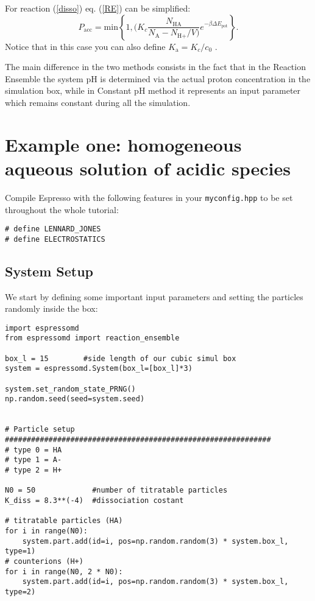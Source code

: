 \documentclass[
a4paper,                        %
11pt,                           %
twoside,                        %
footsepline,                    %
headsepline,                    %
headexclude,                    %
footexclude,                    %
pagesize,                       %
]{scrartcl}
\begin{document}
\noindent For reaction (\ref{disso}) eq. (\ref{RE}) can be simplified: 
\begin{equation}
P_{\text{acc}} = \text{min} \left\lbrace 1, (  K_c \frac{N_{\text{HA}}}{N_\text{A} - N_{\text{H}+}/V)} e^{-\beta \Delta E_\text{pot}}  \right\rbrace\text{.}
\end{equation}
Notice that in this case you can also define $K_\text{a} = K_c/c_0$ .

The main difference in the two methods consists in the fact that in the Reaction Ensemble the system pH is determined via the actual proton concentration in the simulation box, while in Constant pH method it represents an input parameter which remains constant during all the simulation.


\section{Example one: homogeneous aqueous solution of acidic species}

Compile Espresso with the following features in your
\texttt{myconfig.hpp} to be set throughout the whole tutorial:

\begin{verbatim}
# define LENNARD_JONES
# define ELECTROSTATICS
\end{verbatim}

\subsection{System Setup}

We start by defining some important input parameters and setting the particles randomly inside the box:
\begin{verbatim}
import espressomd
from espressomd import reaction_ensemble

box_l = 15        #side length of our cubic simul box
system = espressomd.System(box_l=[box_l]*3)

system.set_random_state_PRNG()
np.random.seed(seed=system.seed)


# Particle setup
#############################################################
# type 0 = HA
# type 1 = A-
# type 2 = H+

N0 = 50             #number of titratable particles
K_diss = 8.3**(-4)  #dissociation costant 
 
# titratable particles (HA)
for i in range(N0):
    system.part.add(id=i, pos=np.random.random(3) * system.box_l, type=1)
# counterions (H+)   
for i in range(N0, 2 * N0):
    system.part.add(id=i, pos=np.random.random(3) * system.box_l, type=2)
\end{verbatim}
\end{document}
